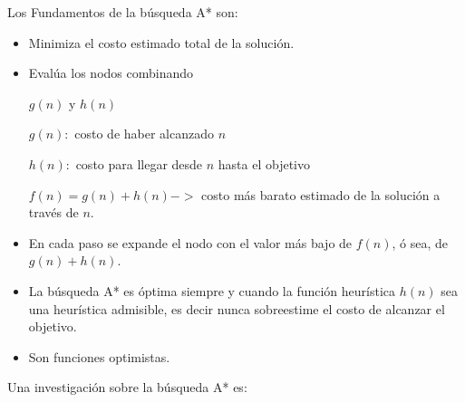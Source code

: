 \documentclass[10pt,conference]{IEEEtran}
\begin{document}
Los Fundamentos de la búsqueda A* son:
\begin{itemize}
\item Minimiza el costo estimado total de la solución.
\item Evalúa los nodos combinando
 \begin{center}
$g(n)$ y $h(n)$
 \end{center}
\par $g(n):$ costo de haber alcanzado $n$
\par $h(n):$ costo para llegar desde $n$ hasta el objetivo
\par $f(n) = g(n) + h(n) ->$ costo más barato estimado de la solución a través de $n$.
\item En cada paso se expande el nodo con el valor más bajo de $f(n)$, ó sea, de $g(n)+h(n)$.
\item La búsqueda A* es óptima siempre y cuando la función heurística $h(n)$ sea una heurística admisible, es decir nunca sobreestime el costo de alcanzar el objetivo.
\item Son funciones optimistas.
\end{itemize}

Una investigación sobre la búsqueda A* es:
\end{document}
